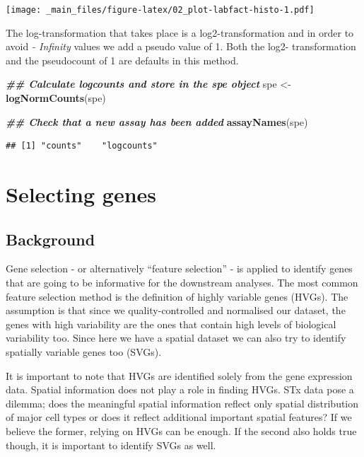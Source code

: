 \documentclass[
]{book}
\newenvironment{Shaded}{\begin{snugshade}}{\end{snugshade}}
\newcommand{\DocumentationTok}[1]{\textcolor[rgb]{0.56,0.35,0.01}{\textbf{\textit{#1}}}}
\newcommand{\FunctionTok}[1]{\textcolor[rgb]{0.13,0.29,0.53}{\textbf{#1}}}
\newcommand{\NormalTok}[1]{#1}
\newcommand{\OtherTok}[1]{\textcolor[rgb]{0.56,0.35,0.01}{#1}}
\begin{document}
\texttt{[image: \_main\_files/figure-latex/02\_plot-labfact-histo-1.pdf]}

The log-transformation that takes place is a log2-transformation and in order to avoid \emph{- Infinity} values we add a pseudo value of 1. Both the log2- transformation and the pseudocount of 1 are defaults in this method.

\begin{Shaded}
\begin{Highlighting}[]
\DocumentationTok{\#\# Calculate logcounts and store in the spe object}
\NormalTok{spe }\OtherTok{\textless{}{-}} \FunctionTok{logNormCounts}\NormalTok{(spe)}

\DocumentationTok{\#\# Check that a new assay has been added}
\FunctionTok{assayNames}\NormalTok{(spe)}
\end{Highlighting}
\end{Shaded}

\begin{verbatim}
## [1] "counts"    "logcounts"
\end{verbatim}

\hypertarget{selecting-genes}{%
\section{Selecting genes}\label{selecting-genes}}

\hypertarget{background-1}{%
\subsection{Background}\label{background-1}}

Gene selection - or alternatively ``feature selection'' - is applied to identify genes that are going to be informative for the downstream analyses. The most common feature selection method is the definition of highly variable genes (HVGs). The assumption is that since we quality-controlled and normalised our dataset, the genes with high variability are the ones that contain high levels of biological variability too. Since here we have a spatial dataset we can also try to identify spatially variable genes too (SVGs).

It is important to note that HVGs are identified solely from the gene expression data. Spatial information does not play a role in finding HVGs. STx data pose a dilemma; does the meaningful spatial information reflect only spatial distribution of major cell types or does it reflect additional important spatial features? If we believe the former, relying on HVGs can be enough. If the second also holds true though, it is important to identify SVGs as well.
\end{document}
